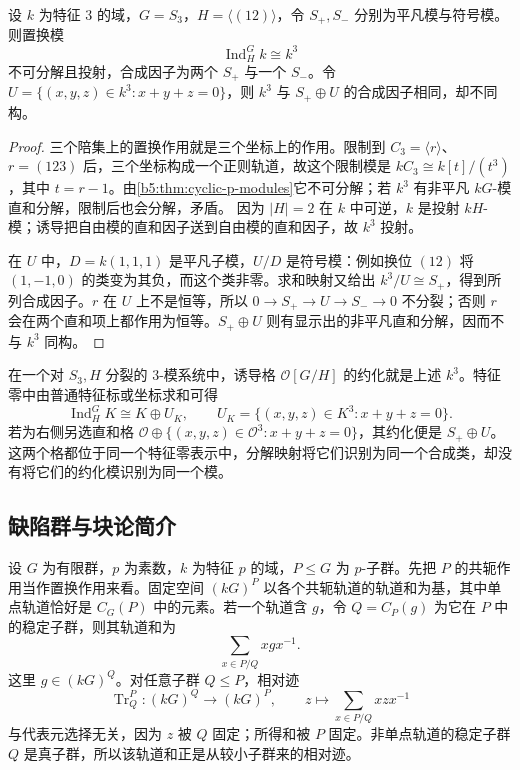 \begin{example}\label{b5:exm:s3-induced-lattice}
	设 \(k\) 为特征 \(3\) 的域，\(G=S_3\)，\(H=\langle(12)\rangle\)，令 \(S_+,S_-\) 分别为平凡模与符号模。则置换模
	\[
		\operatorname{Ind}_H^G k\cong k^3
	\]
	不可分解且投射，合成因子为两个 \(S_+\) 与一个 \(S_-\)。令 \(U=\{(x,y,z)\in k^3:x+y+z=0\}\)，则 \(k^3\) 与 \(S_+\oplus U\) 的合成因子相同，却不同构。
\end{example}
\begin{proof}
	三个陪集上的置换作用就是三个坐标上的作用。限制到 \(C_3=\langle r\rangle\)、\(r=(123)\) 后，三个坐标构成一个正则轨道，故这个限制模是 \(kC_3\cong k[t]/(t^3)\)，其中 \(t=r-1\)。由\cref{b5:thm:cyclic-p-modules}它不可分解；若 \(k^3\) 有非平凡 \(kG\)-模直和分解，限制后也会分解，矛盾。 因为 \(|H|=2\) 在 \(k\) 中可逆，\(k\) 是投射 \(kH\)-模；诱导把自由模的直和因子送到自由模的直和因子，故 \(k^3\) 投射。

	在 \(U\) 中，\(D=k(1,1,1)\) 是平凡子模，\(U/D\) 是符号模：例如换位 \((12)\) 将 \((1,-1,0)\) 的类变为其负，而这个类非零。求和映射又给出 \(k^3/U\cong S_+\)，得到所列合成因子。\(r\) 在 \(U\) 上不是恒等，所以 \(0\to S_+\to U\to S_-\to0\) 不分裂；否则 \(r\) 会在两个直和项上都作用为恒等。\(S_+\oplus U\) 则有显示出的非平凡直和分解，因而不与 \(k^3\) 同构。
\end{proof}
在一个对 \(S_3,H\) 分裂的 \(3\)-模系统中，诱导格 \(\mathcal O[G/H]\) 的约化就是上述 \(k^3\)。特征零中由普通特征标或坐标求和可得
\[
	\operatorname{Ind}_H^G K\cong K\oplus U_K,\qquad U_K=\{(x,y,z)\in K^3:x+y+z=0\}.
\]
若为右侧另选直和格 \(\mathcal O\oplus\{(x,y,z)\in\mathcal O^3:x+y+z=0\}\)，其约化便是 \(S_+\oplus U\)。这两个格都位于同一个特征零表示中，分解映射将它们识别为同一个合成类，却没有将它们的约化模识别为同一个模。

\subsection{缺陷群与块论简介}
\label{b5:subsec:0804:02}

设 \(G\) 为有限群，\(p\) 为素数，\(k\) 为特征 \(p\) 的域，\(P\le G\) 为 \(p\)-子群。先把 \(P\) 的共轭作用当作置换作用来看。固定空间 \((kG)^P\) 以各个共轭轨道的轨道和为基，其中单点轨道恰好是 \(C_G(P)\) 中的元素。若一个轨道含 \(g\)，令 \(Q=C_P(g)\) 为它在 \(P\) 中的稳定子群，则其轨道和为
\[
	\sum_{x\in P/Q}xgx^{-1}.
\]
这里 \(g\in(kG)^Q\)。对任意子群 \(Q\le P\)，相对迹
\[
	\operatorname{Tr}_Q^P:(kG)^Q\longrightarrow(kG)^P,\qquad z\longmapsto\sum_{x\in P/Q}xzx^{-1}
\]
与代表元选择无关，因为 \(z\) 被 \(Q\) 固定；所得和被 \(P\) 固定。非单点轨道的稳定子群 \(Q\) 是真子群，所以该轨道和正是从较小子群来的相对迹。

